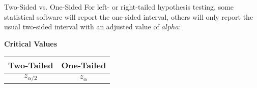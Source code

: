 \documentclass[t]{beamer}
\begin{document}
\begin{frame}{Two-Sided vs. One-Sided}
For left- or right-tailed hypothesis testing, some statistical software will report the one-sided interval, others will only report the usual two-sided interval with an adjusted value of $alpha$:	\newline\\

\begin{center}
\textbf{Critical Values} \newline\\
\begin{tabular}{c|c}
Two-Tailed & One-Tailed \\ \hline
$z_{\alpha/2}$ & $z_{\alpha}$ \\
\end{tabular}
\end{center}

\end{frame}
\end{document}

